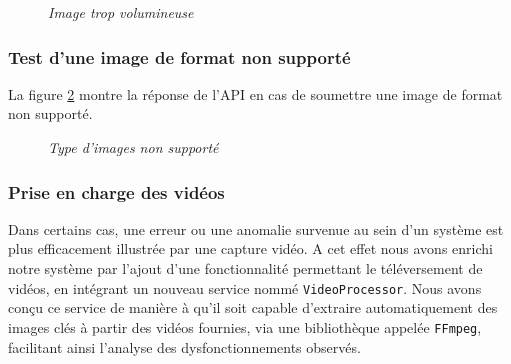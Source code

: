 \documentclass[12pt,a4paper]{report}
\begin{document}
	\begin{figure}[H]
		\centering
		\caption{\textit{Image trop volumineuse}}
		\label{fig:image-tros-grande}
	\end{figure}
	
	\subsubsection{Test d'une image de format non supporté}
	
	La figure \ref{fig:format-non-supporté} montre la réponse de l'API en cas de soumettre une image de format non supporté.
	
	\begin{figure}[H]
		\centering
		\caption{\textit{Type d'images non supporté}}
		\label{fig:format-non-supporté}
	\end{figure}
	
	\subsubsection{Prise en charge des vidéos}
	
	Dans certains cas, une erreur ou une anomalie survenue au sein d’un système est plus efficacement illustrée par une capture vidéo. A cet effet nous avons enrichi notre système par l’ajout d’une fonctionnalité permettant le téléversement de vidéos, en intégrant un nouveau service nommé \verb|VideoProcessor|. Nous avons conçu ce service de manière à qu'il soit capable d'extraire automatiquement des images clés à partir des vidéos fournies, via une bibliothèque appelée \verb|FFmpeg|, facilitant ainsi l’analyse des dysfonctionnements observés.
	
\end{document}

